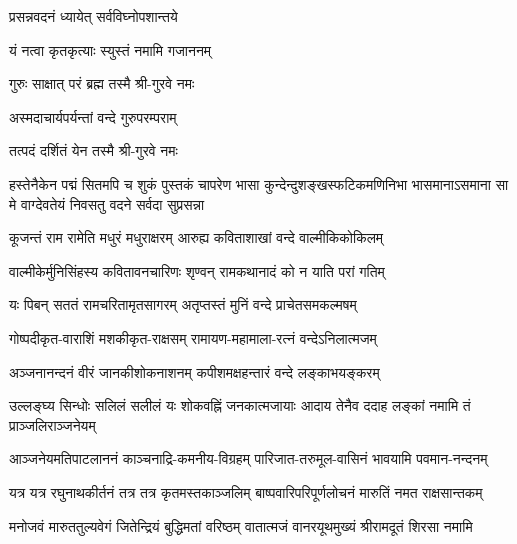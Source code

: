 

{प्रसन्नवदनं ध्यायेत् सर्वविघ्नोपशान्तये}

{यं नत्वा कृतकृत्याः स्युस्तं नमामि गजाननम्}


{गुरुः साक्षात् परं ब्रह्म तस्मै श्री-गुरवे नमः}

{अस्मदाचार्यपर्यन्तां वन्दे गुरुपरम्पराम्}

{तत्पदं दर्शितं येन तस्मै श्री-गुरवे नमः}

{हस्तेनैकेन पद्मं सितमपि च शुकं पुस्तकं चापरेण}
{भासा कुन्देन्दुशङ्खस्फटिकमणिनिभा भासमानाऽसमाना}
{सा मे वाग्देवतेयं निवसतु वदने सर्वदा सुप्रसन्ना}


\twolineshloka
{कूजन्तं राम रामेति मधुरं मधुराक्षरम्}
{आरुह्य कविताशाखां वन्दे वाल्मीकिकोकिलम्}

\twolineshloka
{वाल्मीकेर्मुनिसिंहस्य कवितावनचारिणः}
{शृण्वन् रामकथानादं को न याति परां गतिम्}

\twolineshloka
{यः पिबन् सततं रामचरितामृतसागरम्}
{अतृप्तस्तं मुनिं वन्दे प्राचेतसमकल्मषम्}

\resetShloka
{}

\twolineshloka
{गोष्पदीकृत-वाराशिं मशकीकृत-राक्षसम्}
{रामायण-महामाला-रत्नं वन्देऽनिलात्मजम्}

\twolineshloka
{अञ्जनानन्दनं वीरं जानकीशोकनाशनम्}
{कपीशमक्षहन्तारं वन्दे लङ्काभयङ्करम्}

\twolineshloka
{उल्लङ्घ्य सिन्धोः सलिलं सलीलं यः शोकवह्निं जनकात्मजायाः}
{आदाय तेनैव ददाह लङ्कां नमामि तं प्राञ्जलिराञ्जनेयम्}

\twolineshloka
{आञ्जनेयमतिपाटलाननं काञ्चनाद्रि-कमनीय-विग्रहम्}
{पारिजात-तरुमूल-वासिनं भावयामि पवमान-नन्दनम्}

\twolineshloka
{यत्र यत्र रघुनाथकीर्तनं तत्र तत्र कृतमस्तकाञ्जलिम्}
{बाष्पवारिपरिपूर्णलोचनं मारुतिं नमत राक्षसान्तकम्}

\twolineshloka
{मनोजवं मारुततुल्यवेगं जितेन्द्रियं बुद्धिमतां वरिष्ठम्}
{वातात्मजं वानरयूथमुख्यं श्रीरामदूतं शिरसा नमामि}

